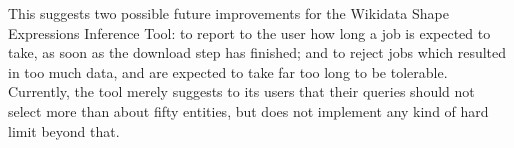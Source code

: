 This suggests two possible future improvements
for the Wikidata Shape Expressions Inference Tool:
to report to the user how long a job is expected to take,
as soon as the download step has finished;
and to reject jobs which resulted in too much data,
and are expected to take far too long to be tolerable.
Currently, the tool merely suggests to its users
that their queries should not select more than about fifty entities,
but does not implement any kind of hard limit beyond that.



